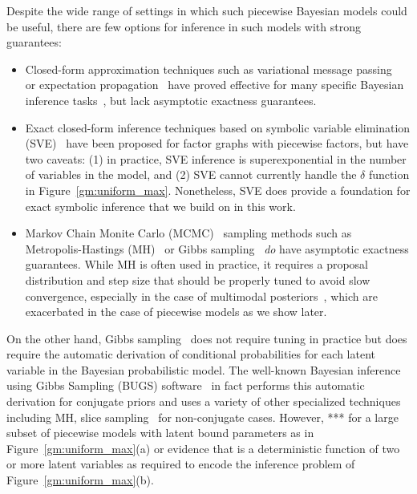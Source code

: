 \documentclass[letterpaper]{article}
\renewcommand{\-}{\text{-}}
\begin{document}
Despite the wide range of settings in which such piecewise Bayesian
models could be useful, there are few options for inference in such
models with strong guarantees:
\begin{itemize}
\item Closed-form approximation techniques such as variational message
  passing~\cite{} or expectation propagation~\cite{} have proved
  effective for many specific Bayesian inference
  tasks~\cite{lda,trueskill,matchbox}, but lack asymptotic exactness
  guarantees.
\item Exact closed-form inference techniques based on symbolic
  variable elimination (SVE)~\cite{sve} have been proposed for factor
  graphs with piecewise factors, but have two caveats: (1) in
  practice, SVE inference is superexponential in the number of
  variables in the model, and (2) SVE cannot currently handle the
  $\delta$ function in Figure~\ref{gm:uniform_max}.  Nonetheless, SVE
  does provide a foundation for exact symbolic inference that we build
  on in this work.
\item Markov Chain Monite Carlo (MCMC)~\cite{hastings70,mcmc} sampling
  methods such as Metropolis-Hastings (MH)~\cite{} or Gibbs
  sampling~\cite{geman} \emph{do} have asymptotic exactness
  guarantees.  While MH is often used in practice, it requires a
  proposal distribution and step size that should be properly tuned to avoid slow
  convergence, especially in the case of multimodal
  posteriors~\cite{}, which are exacerbated in the case of piecewise
  models as we show later.
\end{itemize}
On the other hand, Gibbs sampling~\cite{geman} does not require
tuning in practice but does require the automatic derivation of
conditional probabilities for each latent variable in the Bayesian
probabilistic model.  The well-known Bayesian inference using
Gibbs Sampling (BUGS) software~\cite{winbugs} in fact performs
this automatic derivation for conjugate priors and uses a variety
of other specialized techniques including MH, slice sampling~\cite{neal}
for non-conjugate cases.  However, ***
for a large subset of piecewise models with latent bound parameters
as in Figure~\ref{gm:uniform_max}(a) or evidence that is a deterministic
function of two or more latent variables as required to encode
the inference problem of Figure~\ref{gm:uniform_max}(b).
\end{document}
